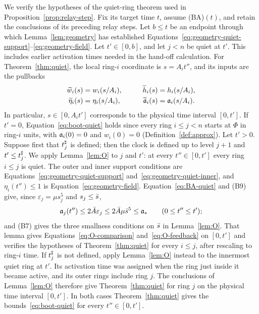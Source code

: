 We verify the hypotheses of the quiet-ring theorem used in
Proposition~\ref{prop:relay-step}. Fix its target time $t$, assume (BA)$(t)$,
and retain the conclusions of its preceding relay steps. Let $b\le t$ be an
endpoint through which Lemma~\ref{lem:geometry} has established
Equations~\eqref{eq:geometry-quiet-support}--\eqref{eq:geometry-field}.
Let $t'\in[0,b]$,
and let $j<n$ be quiet at $t'$. This includes earlier activation times
needed in the hand-off calculation. For Theorem~\ref{thm:quiet}, the
local ring-$i$ coordinate is $s=A_it''$, and its inputs are the pullbacks
\[
\begin{aligned}
\widetilde w_i(s)&=w_i(s/A_i),&\qquad \widetilde h_i(s)&=h_i(s/A_i),\\
\widetilde\eta_i(s)&=\eta_i(s/A_i),&
\widetilde{\mathfrak{a}}_i(s)&=\mathfrak{a}_i(s/A_i).
\end{aligned}
\]
In particular, $s\in[0,A_it']$ corresponds to the physical time interval $[0,t']$.
If $t'=0$, Equation~\eqref{eq:boot-quiet} holds since every ring $i\le j<n$
starts at $\Phi$ in ring-$i$ units, with $\mathfrak{a}_i(0)=0$ and $w_i(0)=0$
(Definition~\ref{def:approx}). Let $t'>0$. Suppose first that $t^\sharp_j$ is defined;
then the clock is defined up to level $j+1$ and $t'\le t^\sharp_j$. We apply
Lemma~\ref{lem:O} to $j$ and $t'$: at every $t''\in[0,t']$ every ring $i\le j$
is quiet. The outer and inner support conditions are
Equations~\eqref{eq:geometry-quiet-support} and~\eqref{eq:geometry-quiet-inner},
and $\eta_i(t'')\le1$ is Equation~\eqref{eq:geometry-field}.
Equation~\eqref{eq:BA-quiet} and (B9) give, since $\varepsilon_j=\mu s_j^5$ and
$s_j\le\bar s$,
\begin{equation}
\label{eq:boot-quiet-smallness}
\mathfrak{a}_j(t'')\le2\bar A\varepsilon_j\le2\bar A\mu\bar s^5\le\mathfrak{a}_*
\qquad(0\le t''\le t');
\end{equation}
and
(B7) gives the three smallness conditions on $\bar s$ in Lemma~\ref{lem:O}.
That lemma gives Equations~\eqref{eq:O-comparison} and~\eqref{eq:O-feedback}
on $[0,t']$ and verifies the hypotheses of Theorem~\ref{thm:quiet} for every
$i\le j$, after rescaling to ring-$i$ time. If $t^\sharp_j$ is not defined, apply
Lemma~\ref{lem:O} instead to the innermost quiet ring at $t'$. Its activation
time was assigned when the ring just inside it became active, and its
outer rings include ring $j$. The conclusions of Lemma~\ref{lem:O} therefore
give Theorem~\ref{thm:quiet} for ring $j$ on the physical time interval $[0,t']$.
In both cases Theorem~\ref{thm:quiet} gives the bounds~\eqref{eq:boot-quiet}
for every $t''\in[0,t']$.

